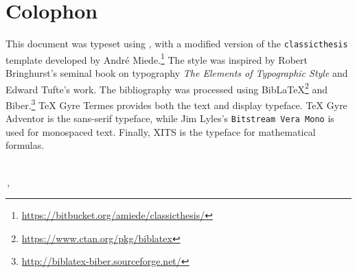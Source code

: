 \pagestyle{empty}

\hfill

\vfill


\section*{Colophon}
This document was typeset using \LuaLaTeX, with a modified version of
the \texttt{classicthesis} template developed by André
Miede.\footnote{\url{https://bitbucket.org/amiede/classicthesis/}}
The style was inspired by Robert Bringhurst's seminal book on typography
\emph{The Elements of Typographic Style}\autocite{Bringhurst2004-wn}
and Edward Tufte's work.\autocite{Tufte1983-pr, Tufte1994-wf,
Tufte1997-fx, Tufte2006-ui}
The bibliography was processed using
Bib\LaTeX\footnote{\url{https://www.ctan.org/pkg/biblatex}} and
Biber.\footnote{\url{http://biblatex-biber.sourceforge.net/}}
TeX Gyre Termes provides both the text and display typeface.
\textsf{TeX Gyre Adventor} is the sans-serif typeface, while Jim Lyles's
\texttt{Bitstream Vera Mono} is used for monospaced text.
Finally, XITS is the typeface for mathematical formulas.

\bigskip
{\small
\noindent\textit{\myTitle}
\\
\noindent\textcopyright\,\finalVersion, \myName
}

%
%




